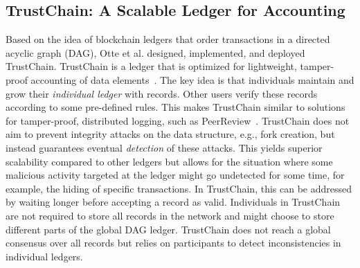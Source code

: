 \subsection{TrustChain: A Scalable Ledger for Accounting} \label{sec:trustchain}
Based on the idea of blockchain ledgers that order transactions in a directed acyclic graph (DAG), Otte et al. designed, implemented, and deployed TrustChain.
TrustChain is a ledger that is optimized for lightweight, tamper-proof accounting of data elements~\cite{otte2017trustchain}.
The key idea is that individuals maintain and grow their \emph{individual ledger} with records.
Other users verify these records according to some pre-defined rules.
This makes TrustChain similar to solutions for tamper-proof, distributed logging, such as PeerReview~\cite{haeberlen2007peerreview}.
TrustChain does not aim to prevent integrity attacks on the data structure, e.g., fork creation, but instead guarantees eventual \emph{detection} of these attacks.
This yields superior scalability compared to other ledgers but allows for the situation where some malicious activity targeted at the ledger might go undetected for some time, for example, the hiding of specific transactions.
In TrustChain, this can be addressed by waiting longer before accepting a record as valid.
Individuals in TrustChain are not required to store all records in the network and might choose to store different parts of the global DAG ledger.
TrustChain does not reach a global consensus over all records but relies on participants to detect inconsistencies in individual ledgers.

